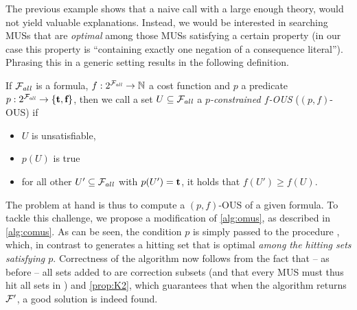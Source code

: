 

The previous example shows that a naive \omus call with a large enough theory, would not yield valuable explanations.
Instead, we would be interested in searching MUSs that are \emph{optimal} among those MUSs satisfying a certain property (in our case this property is ``containing exactly one negation of a consequence literal''). 
Phrasing this in a generic setting results in the following definition.

\begin{definition}
    If $\mathcal{F} _{\mathit{all}}$ is a formula, $f:2^{\mathcal{F} _{\mathit{all}}} \to \mathbb{N}$ a cost function and  $p$ a predicate $p: 2^{\mathcal{F} _{\mathit{all}}}\to \{\textbf{t},\textbf{f}\}$, then we call a set $U\subseteq \mathcal{F} _{\mathit{all}}$ a \emph{$p$-constrained $f$-OUS} ($(p,f)$-OUS) if \begin{itemize}                                                                                                                                                                                                                         
    \item $U$ is unsatisfiable,
    \item $p(U)$ is true
    \item for all other $U'\subseteq \mathcal{F} _{\mathit{all}}$ with $p(U')=\textbf{t}$, it holds that $f(U')\geq f(U)$.                                                                                                                                                                                                                         \end{itemize}
\end{definition}

The problem at hand is thus to compute a $(p,f)$-OUS of a given formula. 
To tackle this challenge, we propose a modification of \cref{alg:omus}, as described in \cref{alg:comus}. 
As can be seen, the condition $p$ is simply passed to the procedure \cohs, which, in contrast to \ohs generates a hitting set that is optimal \emph{among the hitting sets satisfying $p$}. Correctness of the algorithm now follows from the fact that -- as before -- all sets added to \setstohit are correction subsets (and that every MUS must thus hit all sets in \setstohit) and \cref{prop:K2}, which guarantees that when the algorithm returns $\mathcal{F} '$, a good solution is indeed found.  

